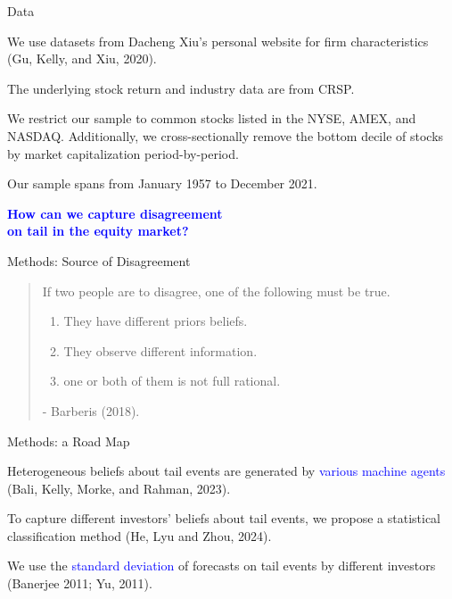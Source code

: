 \documentclass[11pt, aspectratio=169]{beamer}
\newenvironment{wideitemize}{\itemize\addtolength{\itemsep}{10pt}}{\enditemize}
\begin{document}
\begin{frame}{Data}
    \bigskip
    \begin{wideitemize}
    \item We use datasets from Dacheng Xiu's personal website for firm characteristics (Gu, Kelly, and Xiu, 2020).
    \item The underlying stock return and industry data are from CRSP.
    \item We restrict our sample to common stocks listed in the NYSE, AMEX, and NASDAQ. Additionally, we cross-sectionally remove the bottom decile of stocks by market capitalization period-by-period.
    \item Our sample spans from January 1957 to December 2021.
    \end{wideitemize}
\end{frame}

\begin{frame}
    \begin{center}
        {\Large \textbf{\textcolor{blue}{How can we \alert{capture} disagreement \\[1em] on tail in the equity market?}}}
    \end{center}
\end{frame}

\begin{frame}{Methods: Source of Disagreement }
    \begin{quote}
    If two people are to disagree, one of the following must be true.
    \bigskip
    \begin{enumerate}
        \item \alert{They have different priors beliefs.}
    \bigskip
        \item They observe different information.
    \bigskip
        \item one or both of them is not full rational.
    \end{enumerate}
    \bigskip
    - Barberis (2018).
    \end{quote}
\end{frame}

\begin{frame}{Methods: a Road Map}
    \bigskip
    \begin{wideitemize}
    \item Heterogeneous beliefs about tail events are generated by \textcolor{blue}{various machine agents} (Bali, Kelly, Morke, and Rahman, 2023).
    
    \item To capture different investors' beliefs about tail events, we propose a statistical \alert{classification} method (He, Lyu and Zhou, 2024).

    \item We use the \textcolor{blue}{standard deviation} of forecasts on tail events by different investors (Banerjee 2011; Yu, 2011).
    \end{wideitemize}
\end{frame}
\end{document}
